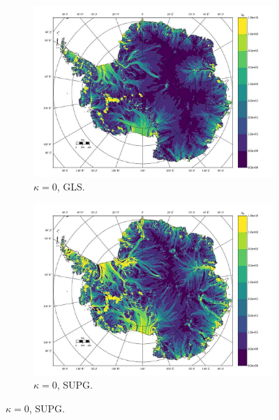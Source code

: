 \begin{figure}
  \label{antarctica_bv_image_U_ob_S}

\end{figure}


\begin{figure}

  \centering

  \begin{subfigure}[b]{0.45\linewidth}
    \includegraphics[width=\linewidth]{images/balance_velocity/antarctica/d_U_ob/Ubar_10H_kappa_0_GLS.jpg}
  \caption{$\kappa = 0$, GLS.}
  \label{antarctica_bv_image_d_U_ob_kappa_0_GLS}
  \end{subfigure}
  \begin{subfigure}[b]{0.45\linewidth}
    \includegraphics[width=\linewidth]{images/balance_velocity/antarctica/d_U_ob/Ubar_10H_kappa_0_SUPG.jpg}
  \caption{$\kappa = 0$, SUPG.}
  \label{antarctica_bv_image_d_U_ob_kappa_0_SUPG}
  \end{subfigure}


\end{figure}
